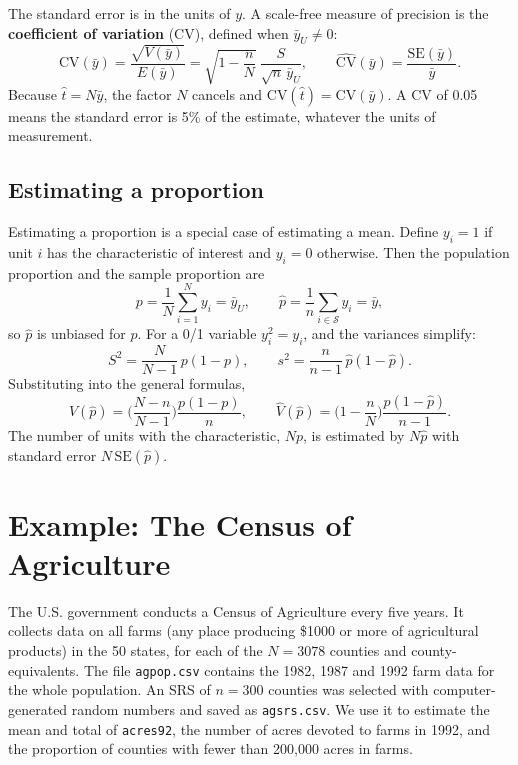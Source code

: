 \documentclass[
  letterpaper,
  DIV=11,
  numbers=noendperiod]{scrreprt}
\renewcommand{\[}{\begin{equation}}
\renewcommand{\]}{\end{equation}}
\begin{document}
The standard error is in the units of \(y\). A scale-free measure of
precision is the \textbf{coefficient of variation} (CV), defined when
\(\bar y_U \ne 0\): \[
\mathrm{CV}(\bar y) = \frac{\sqrt{V(\bar y)}}{E(\bar y)}
 = \sqrt{1-\frac nN}\ \frac{S}{\sqrt n\, \bar y_{U}},
\qquad
\widehat{\mathrm{CV}}(\bar y) = \frac{\mathrm{SE}(\bar y)}{\bar y} .
\] Because \(\hat t = N\bar y\), the factor \(N\) cancels and
\(\mathrm{CV}(\hat t) = \mathrm{CV}(\bar y)\). A CV of 0.05 means the
standard error is 5\% of the estimate, whatever the units of
measurement.

\subsection{Estimating a proportion}\label{estimating-a-proportion}

Estimating a proportion is a special case of estimating a mean. Define
\(y_i=1\) if unit \(i\) has the characteristic of interest and \(y_i=0\)
otherwise. Then the population proportion and the sample proportion are
\[
p = \frac{1}{N}\sum_{i=1}^N y_i = \bar y_{U}, \qquad
\hat p = \frac1n\sum_{i\in\mathcal S} y_i = \bar y ,
\] so \(\hat p\) is unbiased for \(p\). For a 0/1 variable
\(y_i^2 = y_i\), and the variances simplify: \[
S^2 = \frac{N}{N-1}\,p(1-p), \qquad
s^2 = \frac{n}{n-1}\,\hat p(1-\hat p).
\] Substituting into the general formulas, \[
V(\hat p) = \Big(\frac{N-n}{N-1}\Big)\frac{p(1-p)}{n},
\qquad
\boxed{\hat V(\hat p) = \Big(1-\frac nN\Big)\frac{\hat p (1-\hat p)}{n-1}.}
\] The number of units with the characteristic, \(Np\), is estimated by
\(N\hat p\) with standard error \(N\,\mathrm{SE}(\hat p)\).

\section{Example: The Census of Agriculture}\label{sec-srs-agsrs}

The U.S. government conducts a Census of Agriculture every five years.
It collects data on all farms (any place producing \$1000 or more of
agricultural products) in the 50 states, for each of the \(N=3078\)
counties and county-equivalents. The file \texttt{agpop.csv} contains
the 1982, 1987 and 1992 farm data for the whole population. An SRS of
\(n=300\) counties was selected with computer-generated random numbers
and saved as \texttt{agsrs.csv}. We use it to estimate the mean and
total of \texttt{acres92}, the number of acres devoted to farms in 1992,
and the proportion of counties with fewer than 200,000 acres in farms.
\end{document}
